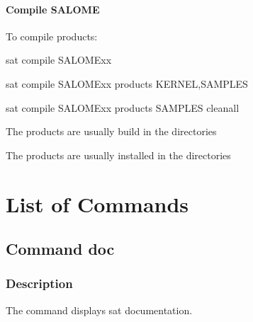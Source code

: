 \documentclass[a4paper,10pt,english]{sphinxmanual}
\begin{document}
\subsubsection{Compile SALOME}
\label{\detokenize{usage_of_sat:compile-salome}}
To compile products:

%
\begin{sphinxVerbatim}[commandchars=\\\{\}]
sat compile SALOME\PYGZus{}xx

sat compile SALOME\PYGZus{}xx \PYGZhy{}\PYGZhy{}products KERNEL,SAMPLES

sat compile SALOME\PYGZus{}xx \PYGZhy{}\PYGZhy{}\PYGZhy{}products SAMPLES \PYGZhy{}\PYGZhy{}clean\PYGZus{}all
\end{sphinxVerbatim}

\begin{DUlineblock}{0em}
\item[] The products are usually build in the directories
\item[] 
\item[] 
\item[] The products are usually installed in the directories
\item[] 
\end{DUlineblock}


\chapter{List of Commands}
\label{\detokenize{index:list-of-commands}}
\clearpage


\section{Command doc}
\label{\detokenize{commands/doc:svn}}\label{\detokenize{commands/doc::doc}}\label{\detokenize{commands/doc:command-doc}}

\subsection{Description}
\label{\detokenize{commands/doc:description}}
The  command displays sat documentation.
\end{document}

